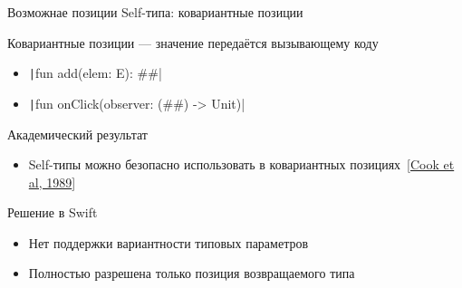 \documentclass[usenames, dvipsnames]{beamer}
\begin{document}
    \begin{frame}[fragile]{Возможнае позиции Self-типа: ковариантные позиции}

        \begin{block}{Ковариантные позиции --- значение передаётся вызывающему коду}
            \begin{itemize}
                \item \texttt|fun add(elem: E): ##| %
                \item \texttt|fun onClick(observer: (##) -> Unit)| %
            \end{itemize}
        \end{block}

        \begin{block}{Академический результат}
            \begin{itemize}
                \item Self-типы можно безопасно использовать в ковариантных позициях~[\href{https://dl.acm.org/doi/pdf/10.1145/96709.96721}{Cook et al, 1989}]
            \end{itemize}
        \end{block}

        \begin{block}{Решение в Swift}
            \begin{itemize}
                \item Нет поддержки вариантности типовых параметров
                \item Полностью разрешена только позиция возвращаемого типа
            \end{itemize}
        \end{block}


\end{frame}
\end{document}
